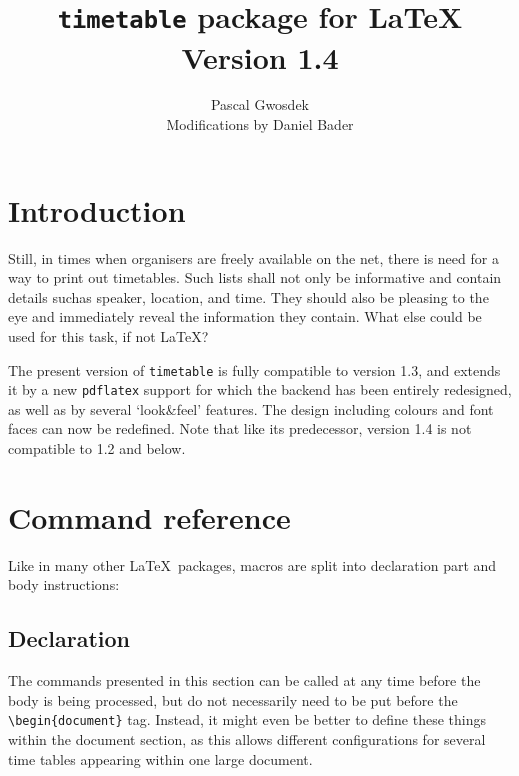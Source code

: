 \documentclass[a4paper,10pt]{article}
\title{\texttt{timetable} package for \LaTeX\\\normalsize Version 1.4}
\author{Pascal Gwosdek\\\small Modifications by Daniel Bader}
\begin{document}
\maketitle

\section{Introduction}
Still, in times when organisers are freely available on the net, there is need for a way to print out timetables. Such lists shall not only be informative and contain details suchas speaker, location, and time. They should also be pleasing to the eye and immediately reveal the information they contain. What else could be used for this task, if not \LaTeX?

The present version of \texttt{timetable} is fully compatible to version 1.3, and extends it by a new \texttt{pdflatex} support for which the backend has been entirely redesigned, as well as by several `look\&feel' features. The design including colours and font faces can now be redefined. Note that like its predecessor, version 1.4 is not compatible to 1.2 and below.

\section{Command reference}
Like in many other \LaTeX\ packages, macros are split into declaration part and body instructions:

\subsection{Declaration}
The commands presented in this section can be called at any time before the body is being processed, but do not necessarily need to be put before the \lstinline{\begin}\texttt{\{document\}} tag. Instead, it might even be better to define these things within the document section, as this allows different configurations for several time tables appearing within one large document.
\end{document}
